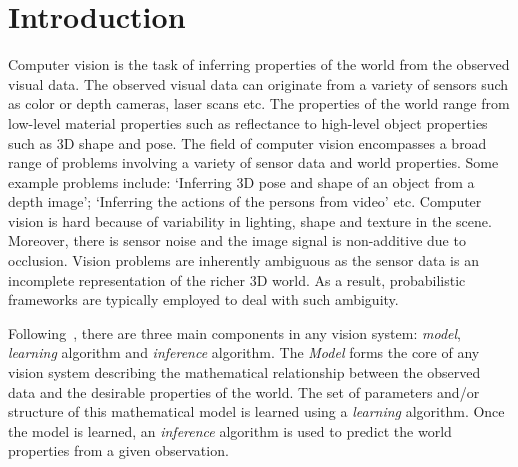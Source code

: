 \chapter{Introduction}
\label{chap:intro}

Computer vision is the task of inferring properties of the world from the
observed visual data. The observed visual data can originate from a variety of
sensors such as color or depth cameras, laser scans etc.
The properties of the world range from low-level material properties
such as reflectance to high-level object properties such as 3D shape and
pose. The field of computer vision encompasses a broad range of problems
involving a variety of sensor data and world properties. Some example
problems include: `Inferring 3D pose and shape of an object from a depth image';
`Inferring the actions of the persons from video' etc.
Computer vision is hard because of variability in lighting, shape and texture in
the scene. Moreover, there is sensor noise and the image signal is non-additive
due to occlusion. Vision problems are inherently ambiguous as the sensor data
is an incomplete representation of the richer 3D world. As a result, probabilistic
frameworks are typically employed to deal with such ambiguity.

Following~\cite{prince2012computer}, there are three main components in any vision
system: \textit{model}, \textit{learning} algorithm and \textit{inference} algorithm.
The \textit{Model} forms the core of any vision system describing the mathematical
relationship between the observed data and the desirable properties of the world.
The set of parameters and/or structure of this mathematical model
is learned using a \textit{learning} algorithm. Once the model
is learned, an \textit{inference} algorithm is used to predict the world properties
from a given observation.

